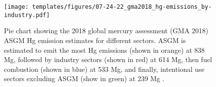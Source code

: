 \begin{figure}[H]
  \texttt{[image: templates/figures/07-24-22\_gma2018\_hg-emissions\_by-industry.pdf]}
  \centering
  \caption[Pie chart showing the 2018 global mercury assessment (GMA 2018) ASGM Hg emission estimates for different sectors.]{ Pie chart showing the 2018 global mercury assessment (GMA 2018) ASGM Hg emission estimates for different sectors. ASGM is estimated to emit the most Hg emissions (shown in orange) at 838 Mg, followed by industry sectors (shown in red) at 614 Mg, then fuel combustion (shown in blue) at 533 Mg, and finally, intentional use sectors excluding ASGM (show in green) at 239 Mg \cite{united_nations_environment_programme_technical_2019}.}
  \label{fig:gma2018_hg-emissions_by-industry}
\end{figure}
\FloatBarrier

